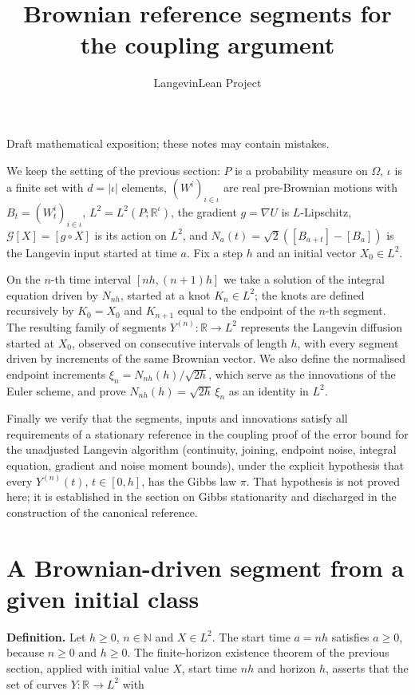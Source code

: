 \documentclass[11pt,a4paper]{article}
\title{\texorpdfstring{Brownian reference segments for the coupling argument}{Brownian reference segments for the coupling argument}}
\author{LangevinLean Project}
\date{}
\begin{document}
\maketitle
Draft mathematical exposition; these notes may contain mistakes.


We keep the setting of the previous section: \(P\) is a probability measure on \(\Omega\), \(\iota\) is a finite set with \(d=|\iota|\) elements, \((W^i)_{i\in\iota}\) are real pre-Brownian motions with \(B_t=(W^i_t)_{i\in\iota}\), \(L^2=L^2(P;\mathbb R^\iota)\), the gradient \(g=\nabla U\) is \(L\)-Lipschitz, \(\mathcal G[X]=[g\circ X]\) is its action on \(L^2\), and \(N_a(t)=\sqrt2([B_{a+t}]-[B_a])\) is the Langevin input started at time \(a\). Fix a step \(h\) and an initial vector \(X_0\in L^2\).




On the \(n\)-th time interval \([nh,(n+1)h]\) we take a solution of the integral equation driven by \(N_{nh}\), started at a knot \(K_n\in L^2\); the knots are defined recursively by \(K_0=X_0\) and \(K_{n+1}\) equal to the endpoint of the \(n\)-th segment. The resulting family of segments \(Y^{(n)}:\mathbb R\to L^2\) represents the Langevin diffusion started at \(X_0\), observed on consecutive intervals of length \(h\), with every segment driven by increments of the same Brownian vector. We also define the normalised endpoint increments \(\xi_n=N_{nh}(h)/\sqrt{2h}\), which serve as the innovations of the Euler scheme, and prove \(N_{nh}(h)=\sqrt{2h}\,\xi_n\) as an identity in \(L^2\).




Finally we verify that the segments, inputs and innovations satisfy all requirements of a stationary reference in the coupling proof of the error bound for the unadjusted Langevin algorithm (continuity, joining, endpoint noise, integral equation, gradient and noise moment bounds), under the explicit hypothesis that every \(Y^{(n)}(t)\), \(t\in[0,h]\), has the Gibbs law \(\pi\). That hypothesis is not proved here; it is established in the section on Gibbs stationarity and discharged in the construction of the canonical reference.


\section{\texorpdfstring{A Brownian-driven segment from a given initial class}{A Brownian-driven segment from a given initial class}}


\textbf{Definition.} Let \(h\ge0\), \(n\in\mathbb N\) and \(X\in L^2\). The start time \(a=nh\) satisfies \(a\ge0\), because \(n\ge0\) and \(h\ge0\). The finite-horizon existence theorem of the previous section, applied with initial value \(X\), start time \(nh\) and horizon \(h\), asserts that the set of curves \(Y:\mathbb R\to L^2\) with
\end{document}
